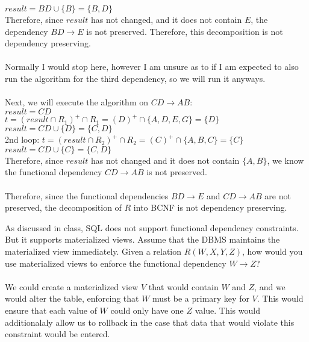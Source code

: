 \documentclass[a4 paper]{article}
\begin{document}
$result=BD\cup\{B\}=\{B,D\}$\\
Therefore, since $result$ has not changed, and it does not contain $E$, the dependency $BD\rightarrow E$ is not preserved. Therefore, this decomposition is not dependency preserving.\\\\
Normally I would stop here, however I am unsure as to if I am expected to also run the algorithm for the third dependency, so we will run it anyways.\\\\
Next, we will execute the algorithm on $CD\rightarrow AB$:\\
$result = CD$\\
$t=(result\cap R_1)^+\cap R_1=(D)^+\cap\{A,D,E,G\}=\{D\}$\\
$result=CD\cup\{D\}=\{C,D\}$\\
2nd loop:
$t=(result\cap R_2)^+\cap R_2=(C)^+\cap\{A,B,C\}=\{C\}$\\
$result=CD\cup\{C\}=\{C,D\}$\\
Therefore, since $result$ has not changed and it does not contain $\{A,B\}$, we know the functional dependency $CD\rightarrow AB$ is not preserved.\\\\
Therefore, since the functional dependencies $BD\rightarrow E$ and $CD\rightarrow AB$ are not preserved, the decomposition of $R$ into BCNF is not dependency preserving.

As discussed in class, SQL does not support functional dependency constraints. But it supports materialized views. Assume that the DBMS maintains the materialized view immediately. Given a relation $R(W, X, Y, Z)$, how would you use materialized views to enforce the functional dependency $W \rightarrow Z$?\\\\

We could create a materialized view $V$ that would contain $W$ and $Z$, and we would alter the table, enforcing that $W$ must be a primary key for $V$. This would ensure that each value of $W$ could only have one $Z$ value. This would additionalaly allow us to rollback in the case that data that would violate this constraint would be entered.
\end{document}

